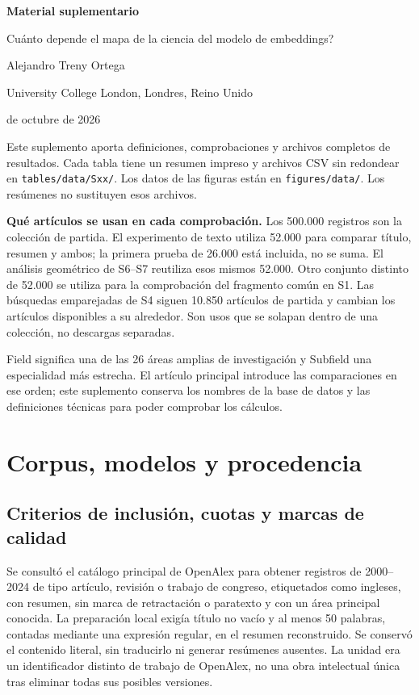\documentclass[12pt]{article}
\begin{document}
\begin{center}
{\LARGE\bfseries Material suplementario\par}
\medskip
{\large \textquestiondown{}Cuánto depende el mapa de la ciencia del modelo de embeddings?\par}
\medskip
Alejandro Treny Ortega\par
University College London, Londres, Reino Unido\par
{} de octubre de 2026
\end{center}

Este suplemento aporta definiciones, comprobaciones y archivos completos de resultados. Cada tabla tiene un resumen impreso y archivos CSV sin redondear en \nolinkurl{tables/data/Sxx/}. Los datos de las figuras están en \nolinkurl{figures/data/}. Los resúmenes no sustituyen esos archivos.

\textbf{Qué artículos se usan en cada comprobación.}
Los 500.000 registros son la colección de partida. El experimento de texto utiliza 52.000 para comparar título, resumen y ambos; la primera prueba de 26.000 está incluida, no se suma. El análisis geométrico de S6--S7 reutiliza esos mismos 52.000. Otro conjunto distinto de 52.000 se utiliza para la comprobación del fragmento común en S1. Las búsquedas emparejadas de S4 siguen 10.850 artículos de partida y cambian los artículos disponibles a su alrededor. Son usos que se solapan dentro de una colección, no descargas separadas.

Field significa una de las 26 áreas amplias de investigación y Subfield una especialidad más estrecha. El artículo principal introduce las comparaciones en ese orden; este suplemento conserva los nombres de la base de datos y las definiciones técnicas para poder comprobar los cálculos.

\medskip
{\small{}\setcounter{tocdepth}{1}\tableofcontents}
\clearpage

\section{Corpus, modelos y procedencia}
\subsection{Criterios de inclusión, cuotas y marcas de calidad}
Se consultó el catálogo principal de OpenAlex para obtener registros de 2000--2024 de tipo artículo, revisión o trabajo de congreso, etiquetados como ingleses, con resumen, sin marca de retractación o paratexto y con un área principal conocida. La preparación local exigía título no vacío y al menos 50 palabras, contadas mediante una expresión regular, en el resumen reconstruido. Se conservó el contenido literal, sin traducirlo ni generar resúmenes ausentes. La unidad era un identificador distinto de trabajo de OpenAlex, no una obra intelectual única tras eliminar todas sus posibles versiones.
\end{document}
